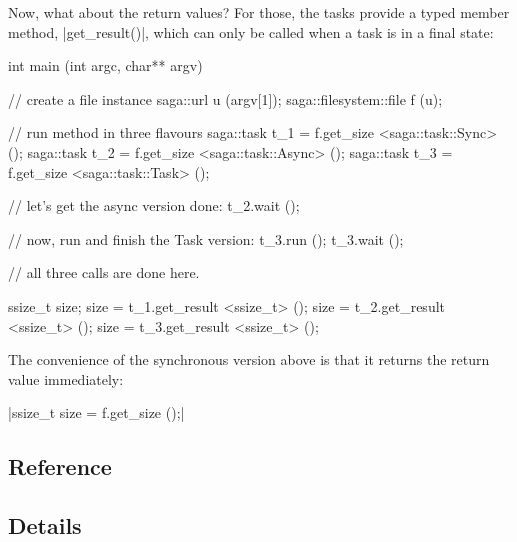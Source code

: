   Now, what about the return values?  For those, the tasks provide a typed
  member method, |get_result()|, which can only be called when a task
  is in a final state:
  
  \begin{mycode}[label=Return values for asynchronous operations]
  int main (int argc, char** argv)
  {
    // create a file instance
    saga::url u (argv[1]);
    saga::filesystem::file f (u);

    // run method in three flavours
    saga::task t_1 = f.get_size <saga::task::Sync>  ();
    saga::task t_2 = f.get_size <saga::task::Async> ();
    saga::task t_3 = f.get_size <saga::task::Task>  ();

    // let's get the async version done:
    t_2.wait ();

    // now, run and finish the Task version:
    t_3.run ();
    t_3.wait ();

    // all three calls are done here.

    ssize_t size;
    size = t_1.get_result <ssize_t> ();
    size = t_2.get_result <ssize_t> ();
    size = t_3.get_result <ssize_t> ();

    
  }
  \end{mycode}
  
  The convenience of the synchronous version
  above is that it returns the return value immediately:

   \shift |ssize_t size = f.get_size ();|
  

 \subsection{Reference}



 \subsection{Details}


